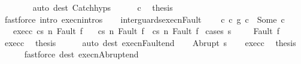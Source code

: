 \begin{isabellebody}
\ \ \ \ \ \ \isamarkupfalse%
\ {\isacharparenleft}auto\ dest{\isacharcolon}\ Catch{\isachardot}hyps{\isacharparenright}\isanewline
\ \ \ \ \isamarkupfalse%
\ c{}\ \isamarkupfalse%
\ {\isacharquery}thesis\isanewline
\ \ \ \ \ \ \isamarkupfalse%
\ {\isacharparenleft}fastforce\ intro{\isacharcolon}\ execn{\isachardot}intros{\isacharparenright}\isanewline
\ \ \isamarkupfalse%
\isanewline
{}\isamarkupfalse%
%
\endisatagproof
{\isafoldproof}%
%
\isadelimproof
\isanewline
%
\endisadelimproof
\isanewline
\isanewline
{}\isamarkupfalse%
\ inter{\isacharunderscore}guards{\isacharunderscore}execn{\isacharunderscore}Fault{\isacharcolon}\ \isanewline
\ \ \ c{\isacharcolon}\ {\isachardoublequoteopen}{\isacharparenleft}c{}\ {\isasyminter}\isactrlsub g\ c{}{\isacharparenright}\ {\isacharequal}\ Some\ c{\isachardoublequoteclose}\isanewline
\ \ \ exec{\isacharunderscore}c{\isacharcolon}\ {\isachardoublequoteopen}{\isasymGamma}{\isasymturnstile}{\isasymlangle}c{\isacharcomma}s{\isasymrangle}\ {\isacharequal}n{\isasymRightarrow}\ Fault\ f{\isachardoublequoteclose}\isanewline
\ \ \ {\isachardoublequoteopen}{\isasymGamma}{\isasymturnstile}{\isasymlangle}c{}{\isacharcomma}s{\isasymrangle}\ {\isacharequal}n{\isasymRightarrow}\ Fault\ f\ {\isasymor}\ {\isasymGamma}{\isasymturnstile}{\isasymlangle}c{}{\isacharcomma}s{\isasymrangle}\ {\isacharequal}n{\isasymRightarrow}\ Fault\ f{\isachardoublequoteclose}\isanewline
%
\isadelimproof
%
\endisadelimproof
%
\isatagproof
{}\isamarkupfalse%
\ {\isacharparenleft}cases\ s{\isacharparenright}\ \isanewline
\ \ \isamarkupfalse%
\ {\isacharparenleft}Fault\ f{\isacharparenright}\isanewline
\ \ \isamarkupfalse%
\ exec{\isacharunderscore}c\ \isamarkupfalse%
\ {\isacharquery}thesis\isanewline
\ \ \ \ \isamarkupfalse%
\ {\isacharparenleft}auto\ dest{\isacharcolon}\ execn{\isacharunderscore}Fault{\isacharunderscore}end{\isacharparenright}\isanewline
{}\isamarkupfalse%
\isanewline
\ \ \isamarkupfalse%
\ {\isacharparenleft}Abrupt\ s{\isacharprime}{\isacharparenright}\isanewline
\ \ \isamarkupfalse%
\ exec{\isacharunderscore}c\ \isamarkupfalse%
\ {\isacharquery}thesis\ \isanewline
\ \ \ \ \isamarkupfalse%
\ {\isacharparenleft}fastforce\ dest{\isacharcolon}\ execn{\isacharunderscore}Abrupt{\isacharunderscore}end{\isacharparenright}\isanewline

\end{isabellebody}
